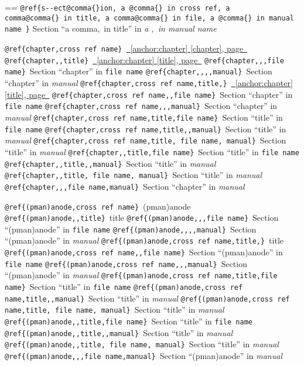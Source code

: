 \documentclass{book}
\makeatletter
\newenvironment{Texinfopreformatted}{%
  \par\GNUTobeylines\obeyspaces\frenchspacing\parskip=\z@\parindent=\z@}{}
{\catcode`\^^M=13 \gdef\GNUTobeylines{\catcode`\^^M=13 \def^^M{\null\par}}}
\newenvironment{Texinfoindented}{\begin{list}{}{}\item\relax}{\end{list}}
\renewcommand{\_}{\Texinfounderscore\discretionary{}{}{}}
\makeatother
\begin{document}
\begin{Texinfoindented}
\begin{Texinfopreformatted}
\texttt{@ref\{s{-}{-}ect@comma\{\}ion,\ a @comma\{\}\ in cross
ref,\ a comma@comma\{\}\ in title,\ a comma@comma\{\}\ in file,\ a @comma\{\}\ in manual name \}}
Section ``a comma,\ in title'' in \textsl{a ,\ in manual name}

\texttt{@ref\{chapter,cross ref name\}}\ \hyperref[anchor:chapter]{\chaptername~\ref*{anchor:chapter} [chapter], page~\pageref*{anchor:chapter}}
\texttt{@ref\{chapter{,}{,}title\}}\ \hyperref[anchor:chapter]{\chaptername~\ref*{anchor:chapter} [title], page~\pageref*{anchor:chapter}}
\texttt{@ref\{chapter{,}{,},file name\}}\ Section ``chapter'' in \texttt{file name}
\texttt{@ref\{chapter{,}{,}{,}{,}manual\}}\ Section ``chapter'' in \textsl{manual}
\texttt{@ref\{chapter,cross ref name,title,\}}\ \hyperref[anchor:chapter]{\chaptername~\ref*{anchor:chapter} [title], page~\pageref*{anchor:chapter}}
\texttt{@ref\{chapter,cross ref name{,}{,}file name\}}\ Section ``chapter'' in \texttt{file name}
\texttt{@ref\{chapter,cross ref name{,}{,},manual\}}\ Section ``chapter'' in \textsl{manual}
\texttt{@ref\{chapter,cross ref name,title,file name\}}\ Section ``title'' in \texttt{file name}
\texttt{@ref\{chapter,cross ref name,title{,}{,}manual\}}\ Section ``title'' in \textsl{manual}
\texttt{@ref\{chapter,cross ref name,title,\ file name,\ manual\}}\ Section ``title'' in \textsl{manual}
\texttt{@ref\{chapter{,}{,}title,file name\}}\ Section ``title'' in \texttt{file name}
\texttt{@ref\{chapter{,}{,}title{,}{,}manual\}}\ Section ``title'' in \textsl{manual}
\texttt{@ref\{chapter{,}{,}title,\ file name,\ manual\}}\ Section ``title'' in \textsl{manual}
\texttt{@ref\{chapter{,}{,},file name,manual\}}\ Section ``chapter'' in \textsl{manual}


\texttt{@ref\{(pman)anode,cross ref name\}}\ (pman)anode
\texttt{@ref\{(pman)anode{,}{,}title\}}\ title
\texttt{@ref\{(pman)anode{,}{,},file name\}}\ Section ``(pman)anode'' in \texttt{file name}
\texttt{@ref\{(pman)anode{,}{,}{,}{,}manual\}}\ Section ``(pman)anode'' in \textsl{manual}
\texttt{@ref\{(pman)anode,cross ref name,title,\}}\ title
\texttt{@ref\{(pman)anode,cross ref name{,}{,}file name\}}\ Section ``(pman)anode'' in \texttt{file name}
\texttt{@ref\{(pman)anode,cross ref name{,}{,},manual\}}\ Section ``(pman)anode'' in \textsl{manual}
\texttt{@ref\{(pman)anode,cross ref name,title,file name\}}\ Section ``title'' in \texttt{file name}
\texttt{@ref\{(pman)anode,cross ref name,title{,}{,}manual\}}\ Section ``title'' in \textsl{manual}
\texttt{@ref\{(pman)anode,cross ref name,title,\ file name,\ manual\}}\ Section ``title'' in \textsl{manual}
\texttt{@ref\{(pman)anode{,}{,}title,file name\}}\ Section ``title'' in \texttt{file name}
\texttt{@ref\{(pman)anode{,}{,}title{,}{,}manual\}}\ Section ``title'' in \textsl{manual}
\texttt{@ref\{(pman)anode{,}{,}title,\ file name,\ manual\}}\ Section ``title'' in \textsl{manual}
\texttt{@ref\{(pman)anode{,}{,},file name,manual\}}\ Section ``(pman)anode'' in \textsl{manual}



\end{Texinfopreformatted}
\end{Texinfoindented}
\end{document}
